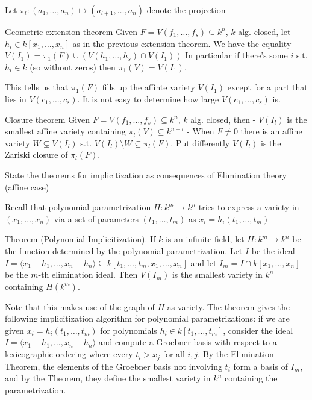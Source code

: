 Let \( \pi_l : (a_1, \dots, a_n) \mapsto (a_{l+1}, \dots, a_n) \) denote the projection

Geometric extension theorem
Given \( F = V(f_1, \dots, f_s) \subseteq k^n \), \( k \) alg. closed,
let \( h_i \in k[x_1, \dots, x_n] \) as in the previous extension theorem.
We have the equality
\( V(I_1) = \pi_1(F) \cup (V(h_1, \dots, h_s) \cap V(I_1)) \)
In particular if there's some \( i \) s.t. \( h_i \in k \) (so without zeros) then \( \pi_1(V) = V(I_1) \).

This tells us that \( \pi_1(F) \) fills up the affinte variety \( V(I_1) \) except for a part that lies 
in \( V(c_1, \dots, c_s) \). It is not easy to determine how large \( V(c_1, \dots, c_s) \) is.

Closure theorem
Given \( F = V(f_1, \dots, f_s) \subseteq k^n \), \( k \) alg. closed, then
- \( V(I_l) \) is the smallest affine variety containing \( \pi_l(V) \subseteq k^{n-l} \)
- When \( F \neq 0 \) there is an affine variety \( W \subsetneq V(I_l) \) s.t. \( V(I_l) \setminus W \subseteq \pi_l(F) \).
  Put differently \( V(I_l) \) is the Zariski closure of \( \pi_l(F) \).




State the theorems for implicitization as consequences of Elimination theory (affine case)

Recall that polynomial parametrization \( H : k^m \to k^n \) tries to express a variety in \( (x_1, \dots, x_n) \) via 
a set of parameters \( (t_1, \dots, t_m) \) as \( x_i = h_i(t_1, \dots, t_m) \)

Theorem (Polynomial Implicitization). 
If \( k \) is an infinite field, let \( H : k^m \to k^n \) be the function determined by the polynomial parametrization. 
Let \( I \) be the ideal \( I = \langle x_1 - h_1, \ldots, x_n - h_n \rangle \subseteq k[t_1, \ldots, t_m, x_1, \ldots, x_n] \) and 
let \( I_m = I \cap k[x_1, \ldots, x_n] \) be the \( m \)-th elimination ideal. 
Then \( V(I_m) \) is the smallest variety in \( k^n \) containing \( H(k^m) \).

Note that this makes use of the graph of \( H \) as variety.
The theorem gives the following implicitization algorithm for polynomial parametrizations: 
if we are given \( x_i = h_i(t_1, \dots, t_m) \) for polynomials \( h_i \in k[t_1, \dots, t_m] \), 
consider the ideal \( I = \langle x_1 - h_1, \dots, x_n - h_n \rangle \) and compute a Groebner
basis with respect to a lexicographic ordering where every \( t_i > x_j \) for all \( i,j \).
By the Elimination Theorem, the elements of the Groebner basis not involving \( t_i \)
form a basis of \( I_m \), and by the Theorem, they define the smallest variety in \( k^n \) containing the parametrization.

